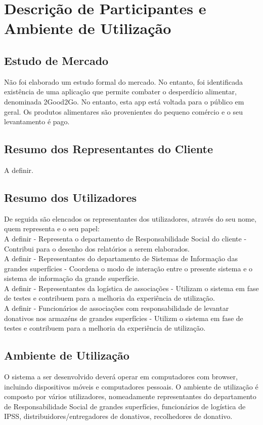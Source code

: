 \section{Descrição de Participantes e Ambiente de Utilização}

\subsection{Estudo de Mercado}
Não foi elaborado um estudo formal do mercado. No entanto, foi identificada existência de uma aplicação que permite combater o desperdício alimentar, denominada 2Good2Go. No entanto, esta app está voltada para o público em geral. Os produtos  alimentares são provenientes do pequeno comércio e o seu levantamento é pago.\\
\subsection{Resumo dos Representantes do Cliente}

A definir.\\

\subsection{Resumo dos Utilizadores}

De seguida são elencados os representantes dos utilizadores, através do seu nome, quem representa e o seu papel:\\

A definir - Representa o departamento de Responsabilidade Social do cliente - Contribui para o desenho dos relatórios a serem elaborados.\\

A definir - Representantes do departamento de Sistemas de Informação das grandes superfícies - Coordena o modo de interação entre o presente sistema e o sistema de informação da grande superfície.\\

A definir - Representantes da logística de associações - Utilizam o sistema em fase de testes e contribuem para a melhoria da experiência de utilização.\\

A definir - Funcionários de associações com responsabilidade de levantar donativos nos armazéns de grandes superfícies - Utilizm o sistema em fase de testes e contribuem para a melhoria da experiência de utilização.\\

\subsection{Ambiente de Utilização}

O sistema a ser desenvolvido deverá operar em computadores com browser, incluindo dispositivos móveis e computadores pessoais. O ambiente de utilização é composto por vários utilizadores, nomeadamente representantes do departamento de Responsabilidade Social de grandes superfícies, funcionários de logística de IPSS, distribuidores/entregadores de donativos, recolhedores de donativo.\\

\clearpage